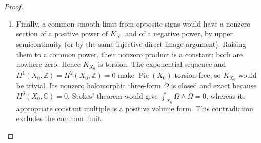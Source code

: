 \begin{proof}
\begin{enumerate}[label={$\langle1\rangle$\arabic*.},leftmargin=*]
\item Finally, a common smooth limit from opposite signs would
have a nonzero section of a positive power of $K_{X_0}$
and of a negative power, by upper semicontinuity (or by
the same injective direct-image argument).  Raising them
to a common power, their nonzero product is a constant;
both are nowhere zero.  Hence $K_{X_0}$ is torsion.
The exponential sequence and $H^1(X_0,\mathbb Z)=
H^2(X_0,\mathbb Z)=0$ make $\operatorname{Pic}(X_0)$
torsion-free, so $K_{X_0}$ would be trivial.  Its nonzero
holomorphic three-form $\Omega$ is closed and exact because
$H^3(X_0,\mathbb C)=0$.  Stokes' theorem would give
$\int_{X_0}\Omega\wedge\overline\Omega=0$, whereas its
appropriate constant multiple is a positive volume form.
This contradiction excludes the common limit.

\end{enumerate}
\end{proof}
